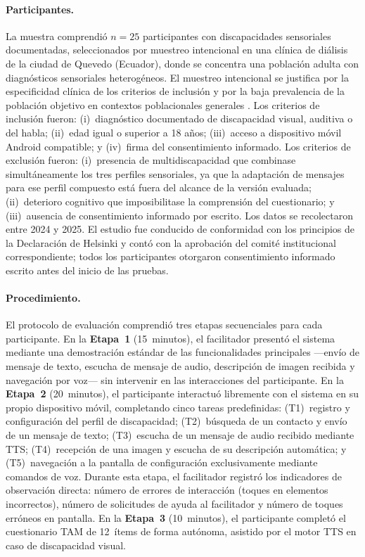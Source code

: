 \documentclass[journal]{IEEEtran}
\begin{document}
				\paragraph{Participantes.} La muestra comprendi\'o $n = 25$ participantes con discapacidades sensoriales documentadas, seleccionados por muestreo intencional \cite{hernandez2014} en una cl\'inica de di\'alisis de la ciudad de Quevedo (Ecuador), donde se concentra una poblaci\'on adulta con diagn\'osticos sensoriales heterog\'eneos. El muestreo intencional se justifica por la especificidad cl\'inica de los criterios de inclusi\'on y por la baja prevalencia de la poblaci\'on objetivo en contextos poblacionales generales \cite{who2011}. Los criterios de inclusi\'on fueron: (i)~diagn\'ostico documentado de discapacidad visual, auditiva o del habla; (ii)~edad igual o superior a 18 a\~nos; (iii)~acceso a dispositivo m\'ovil Android compatible; y (iv)~firma del consentimiento informado. Los criterios de exclusi\'on fueron: (i)~presencia de multidiscapacidad que combinase simult\'aneamente los tres perfiles sensoriales, ya que la adaptaci\'on de mensajes para ese perfil compuesto est\'a fuera del alcance de la versi\'on evaluada; (ii)~deterioro cognitivo que imposibilitase la comprensi\'on del cuestionario; y (iii)~ausencia de consentimiento informado por escrito. Los datos se recolectaron entre 2024 y 2025. El estudio fue conducido de conformidad con los principios de la Declaraci\'on de Helsinki \cite{world2013} y cont\'o con la aprobaci\'on del comit\'e institucional correspondiente; todos los participantes otorgaron consentimiento informado escrito antes del inicio de las pruebas.
				
				\paragraph{Procedimiento.} El protocolo de evaluaci\'on comprendi\'o tres etapas secuenciales para cada participante. En la \textbf{Etapa~1} (15~minutos), el facilitador present\'o el sistema mediante una demostraci\'on est\'andar de las funcionalidades principales ---env\'io de mensaje de texto, escucha de mensaje de audio, descripci\'on de imagen recibida y navegaci\'on por voz--- sin intervenir en las interacciones del participante. En la \textbf{Etapa~2} (20~minutos), el participante interactu\'o libremente con el sistema en su propio dispositivo m\'ovil, completando cinco tareas predefinidas: (T1)~registro y configuraci\'on del perfil de discapacidad; (T2)~b\'usqueda de un contacto y env\'io de un mensaje de texto; (T3)~escucha de un mensaje de audio recibido mediante TTS; (T4)~recepci\'on de una imagen y escucha de su descripci\'on autom\'atica; y (T5)~navegaci\'on a la pantalla de configuraci\'on exclusivamente mediante comandos de voz. Durante esta etapa, el facilitador registr\'o los indicadores de observaci\'on directa: n\'umero de errores de interacci\'on (toques en elementos incorrectos), n\'umero de solicitudes de ayuda al facilitador y n\'umero de toques err\'oneos en pantalla. En la \textbf{Etapa~3} (10~minutos), el participante complet\'o el cuestionario TAM de 12~\'items de forma aut\'onoma, asistido por el motor TTS en caso de discapacidad visual.
				
\end{document}
